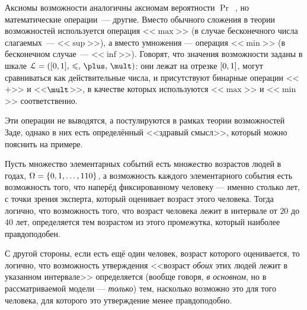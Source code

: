 Аксиомы возможности аналогичны аксиомам вероятности $\Pr$~\cite{kolmogorov}, но математические операции~--- другие. Вместо обычного сложения в теории возможностей используется операция <<$\max$>> (в случае бесконечного числа слагаемых~--- <<$\sup$>>), а вместо умножения --- операция <<$\min$>> (в бесконечном случае~--- <<$\inf$>>). Говорят, что значения возможности заданы в шкале $\scL = \scale$: они лежат на отрезке $[0,1]$, могут сравниваться как действительные числа, и присутствуют бинарные операции <<$\plus$>> и <<$\mult$>>, в качестве которых используются <<$\max$>> и <<$\min$>> соответственно. 

  Эти операции не выводятся, а постулируются в рамках теории возможностей Заде, однако в них есть определённый <<здравый смысл>>, который можно пояснить на примере. \label{example_zadeh}
\begin{example}
Пусть множество элементарных событий есть множество возрастов людей в годах, $\Omega = \{0, 1, \ldots, 110\}$, а возможность каждого элементарного события есть возможность того, что наперёд фиксированному человеку --- именно столько лет, с точки зрения эксперта, который оценивает возраст этого человека.  Тогда логично, что возможность того, что возраст человека лежит в интервале от $20$ до $40$ лет, определяется тем возрастом из этого промежутка, который наиболее правдоподобен. 

С другой стороны, если есть ещё один человек, возраст которого оценивается, то логично, что возможность утверждения <<возраст {\sl обоих} этих людей лежит в указанном интервале>> определяется (вообще говоря, {\sl в основном}, но в рассматриваемой модели --- {\sl только}) тем, насколько возможно это для того человека, для которого это утверждение менее правдоподобно. 
\end{example}

